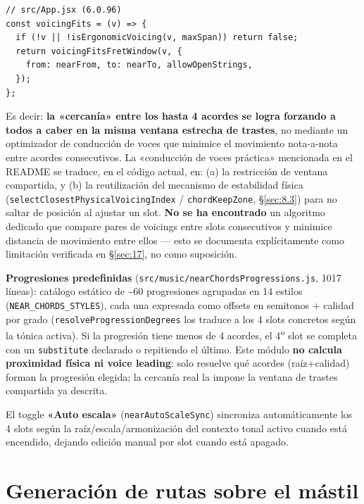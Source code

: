 \documentclass[a4paper,11pt,oneside]{report}
\newcommand{\Sref}[1]{\S\ref{#1}}
\begin{document}
\begin{lstlisting}
// src/App.jsx (6.0.96)
const voicingFits = (v) => {
  if (!v || !isErgonomicVoicing(v, maxSpan)) return false;
  return voicingFitsFretWindow(v, {
    from: nearFrom, to: nearTo, allowOpenStrings,
  });
};
\end{lstlisting}

Es decir: \textbf{la «cercanía» entre los hasta 4 acordes se logra forzando a todos a caber en la misma ventana estrecha de trastes}, no mediante un optimizador de conducción de voces que minimice el movimiento nota-a-nota entre acordes consecutivos. La «conducción de voces práctica» mencionada en el README se traduce, en el código actual, en: (a) la restricción de ventana compartida, y (b) la reutilización del mecanismo de estabilidad física (\lstinline!selectClosestPhysicalVoicingIndex! / \lstinline!chordKeepZone!, \Sref{sec:8.3}) para no saltar de posición al ajustar un slot. \textbf{No se ha encontrado} un algoritmo dedicado que compare pares de voicings entre slots consecutivos y minimice distancia de movimiento entre ellos --- esto se documenta explícitamente como limitación verificada en \Sref{sec:17}, no como suposición.

\textbf{Progresiones predefinidas} (\lstinline!src/music/nearChordsProgressions.js!, 1017 líneas): catálogo estático de \textasciitilde60 progresiones agrupadas en 14 estilos (\lstinline!NEAR_CHORDS_STYLES!), cada una expresada como offsets en semitonos + calidad por grado (\lstinline!resolveProgressionDegrees! los traduce a los 4 slots concretos según la tónica activa). Si la progresión tiene menos de 4 acordes, el 4\textsuperscript{o} slot se completa con un \lstinline!substitute! declarado o repitiendo el último. Este módulo \textbf{no calcula proximidad física ni voice leading}: solo resuelve qué acordes (raíz+calidad) forman la progresión elegida; la cercanía real la impone la ventana de trastes compartida ya descrita.

El toggle \textbf{«Auto escala»} (\lstinline!nearAutoScaleSync!) sincroniza automáticamente los 4 slots según la raíz/escala/armonización del contexto tonal activo cuando está encendido, dejando edición manual por slot cuando está apagado.

\chapter{Generación de rutas sobre el mástil}
\label{sec:10}
\end{document}
